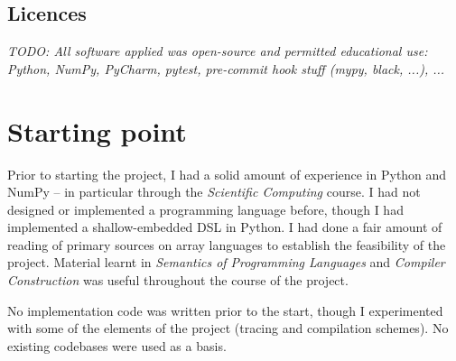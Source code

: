 \subsection{Licences}

\textit{TODO: All software applied was open-source and permitted educational use: Python, NumPy, PyCharm, pytest, pre-commit hook stuff (mypy, black, ...), ...}

\section{Starting point}
\label{starting-point}

Prior to starting the project, I had a solid amount of experience in Python and NumPy -- in particular through the \textit{Scientific Computing} course. I had not designed or implemented a programming language before, though I had implemented a shallow-embedded DSL in Python. I had done a fair amount of reading of primary sources on array languages to establish the feasibility of the project. Material learnt in \textit{Semantics of Programming Languages} and \textit{Compiler Construction} was useful throughout the course of the project.

No implementation code was written prior to the start, though I experimented with some of the elements of the project (tracing and compilation schemes). No existing codebases were used as a basis. 
